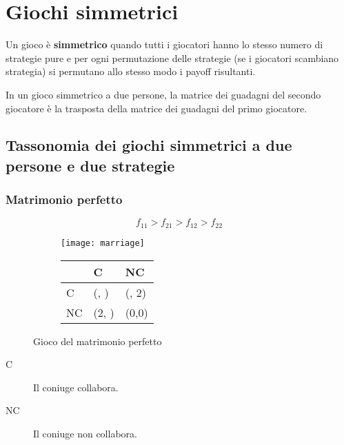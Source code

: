 \documentclass[\main/main.tex]{subfiles}
\begin{document}
\chapter{Giochi simmetrici}

\begin{definition}
  Un gioco è \textbf{simmetrico} quando tutti i giocatori hanno lo stesso numero di strategie pure e per ogni permutazione delle strategie (se i giocatori scambiano strategia) si permutano allo stesso modo i payoff risultanti.
\end{definition}

\begin{definition}
  In un gioco simmetrico a due persone, la matrice dei guadagni del secondo giocatore è la trasposta della matrice dei guadagni del primo giocatore.
\end{definition}

\section{Tassonomia dei giochi simmetrici a due persone e due strategie}
\subsection{Matrimonio perfetto}
\[
  f_{11} > f_{21} > f_{12} > f_{22}
\]

\begin{figure}
  \begin{subfigure}{0.49\textwidth}
    \texttt{[image: marriage]}
  \end{subfigure}
  \begin{subfigure}{0.49\textwidth}
    \begin{table}
      \begin{tabular}{|L|L|L|}
        \hline
           & C                      & NC             \\
        \hline
        C  & (, ) & (, 2) \\
        \hline
        NC & (2, )         & (0,0)          \\
        \hline
      \end{tabular}
    \end{table}
  \end{subfigure}
  \caption{Gioco del matrimonio perfetto}
\end{figure}

\begin{description}
  \item[C] Il coniuge collabora.
  \item[NC] Il coniuge non collabora.
\end{description}
\end{document}

